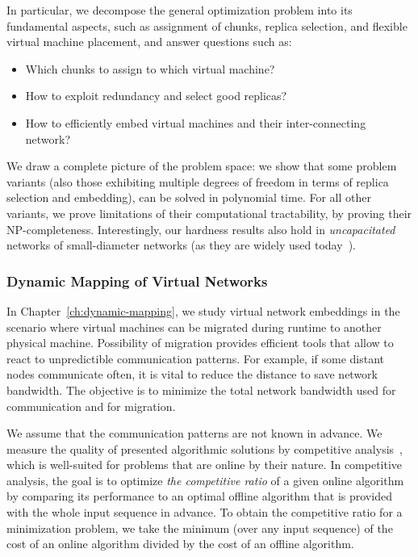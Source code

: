 In particular, we decompose the general optimization problem into its fundamental aspects, such as
assignment of chunks, replica selection, and flexible virtual machine
placement, and answer questions such as:
\begin{itemize}
\item Which chunks to assign to which virtual machine?

\item How to exploit redundancy and select good replicas?

\item How to efficiently embed virtual machines and their inter-connecting network?

\end{itemize}

We draw a complete picture of the problem space: we show that
some problem variants (also those exhibiting multiple degrees of freedom in terms of
replica selection and embedding),
can be solved in polynomial time. For all other variants, we prove limitations of their
computational tractability, by proving their NP-completeness. Interestingly,
our hardness results also hold in \emph{uncapacitated}
networks of small-diameter networks (as they are
widely used today~\cite{fattree}).


\subsubsection{Dynamic Mapping of Virtual Networks}
\label{sec:contributions-dynamic-mapping}

In Chapter~\ref{ch:dynamic-mapping}, we study virtual network embeddings in the scenario where virtual machines can be migrated during runtime to another physical machine.
Possibility of migration provides efficient tools that allow to react to unpredictible communication patterns.
For example, if some distant nodes communicate often, it is vital to reduce the distance to save network bandwidth.
The objective is to minimize the total network bandwidth used for communication and for migration.

We assume that the communication patterns are not known in advance.
We measure the quality of presented algorithmic solutions by competitive analysis~\cite{borodin-book}, which is well-suited for problems that are online by their nature.
In competitive analysis, the goal is to optimize \emph{the competitive ratio} of a given online algorithm by comparing its performance to an optimal offline algorithm that is provided with the whole input sequence in advance.
To obtain the competitive ratio for a minimization problem, we take the minimum (over any input sequence) of the cost of an online algorithm divided by the cost of an offline algorithm.

